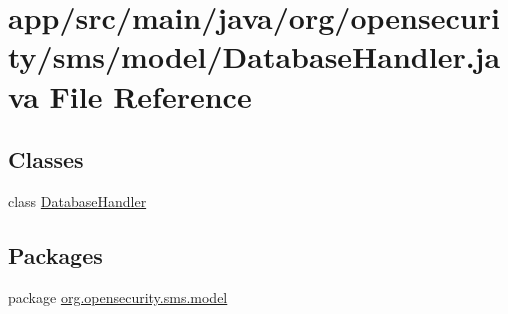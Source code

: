 \hypertarget{a00019}{\section{app/src/main/java/org/opensecurity/sms/model/\+Database\+Handler.java File Reference}
\label{a00019}
}
\subsection*{Classes}
\begin{DoxyCompactItemize}
\item 
class \hyperlink{a00010}{Database\+Handler}
\end{DoxyCompactItemize}
\subsection*{Packages}
\begin{DoxyCompactItemize}
\item 
package \hyperlink{a00036}{org.\+opensecurity.\+sms.\+model}
\end{DoxyCompactItemize}
